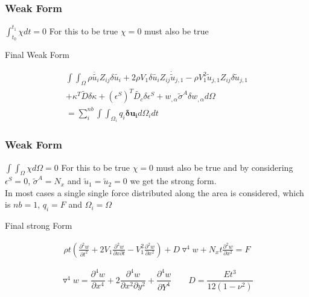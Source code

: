 \documentclass[9pt]{beamer}
\begin{document}
\begin{frame}
\frametitle{Weak Form}
$
\int_{t_0}^{t_1} \chi dt = 0
$
For this to be true
$
 \chi  = 0
$  must also be true
\begin{block}{Final Weak Form}

\begin{equation*}
\begin{split}
 \int \int_\Omega 
\rho \ddot{\tilde{u_i}} Z_{ij} \delta {\tilde{u_i}}
+
2 \rho V_1 \delta {\tilde{u_i}} Z_{ij} \dot{\tilde{u}}_{j,1} 
-
\rho V_1^2 \tilde{u}_{j,1} Z_{ij} \delta \tilde{u}_{j,1}
\\ 
+
\kappa^T \tilde{D} \delta\kappa 
+
\left(\epsilon^S\right)^T \tilde{D_c} \delta\epsilon^S 
+ 
 w_{, \alpha} \tilde{\sigma}^A  \delta w_{, \alpha} d \Omega     \\
=  
 \sum_i^{nb}   \int  \int_{\Omega_i} q_i \mathbf{\delta u_i}  d \Omega_i dt
\end{split} 
\end{equation*}

\end{block}
\end{frame}

\begin{frame}
\frametitle{Weak Form}
$
\int \int_\Omega \chi d\Omega = 0
$
For this to be true
$
 \chi  = 0
$  must also be true and by considering $\epsilon^S=0$, $\tilde{\sigma}^A=N_x$ and $\tilde{u}_1 =\tilde{u}_2 = 0 $ we get the strong  form. \\
In most cases a single single force distributed along the area is considered, which is $nb=1$, $q_i=F$ and $\Omega_i = \Omega$
\begin{block}{Final strong Form}

\begin{equation*}
\begin{split}
\rho t \left( \frac{\partial ^ 2 w}{\partial t ^ 2 }+2V_1\frac{\partial ^ 2 w}{\partial x \partial t}-V_1^2
\frac{\partial ^ 2 w}{\partial x ^ 2 } \right)  + D  \triangledown ^4 w+ N_xt\frac{\partial ^ 2 w}{\partial x ^ 2 }=F 
\end{split} 
\end{equation*}


\end{block}
\begin{equation*}
\triangledown ^4 w = \frac{\partial ^ 4 w}{\partial x ^ 4 }+2 \frac{\partial ^ 4 w}{\partial x ^ 2 \partial y ^ 2 } + \frac{\partial ^ 4 w}{\partial Y ^ 4 } \qquad D = \frac{Et^3}{12 \left( 1 - \nu^2 \right) }
\end{equation*}
\end{frame}
\end{document}
